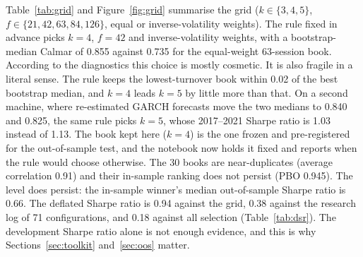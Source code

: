 Table~\ref{tab:grid} and Figure~\ref{fig:grid} summarise the grid ($k\in\{3,4,5\}$, $f\in\{21,42,63,84,126\}$, equal or inverse-volatility weights). The rule fixed in advance picks $k=4$, $f=42$ and inverse-volatility weights, with a bootstrap-median Calmar of 0.855 against 0.735 for the equal-weight 63-session book. According to the diagnostics this choice is mostly cosmetic. It is also fragile in a literal sense. The rule keeps the lowest-turnover book within 0.02 of the best bootstrap median, and $k=4$ leads $k=5$ by little more than that. On a second machine, where re-estimated GARCH forecasts move the two medians to 0.840 and 0.825, the same rule picks $k=5$, whose 2017--2021 Sharpe ratio is 1.03 instead of 1.13. The book kept here ($k=4$) is the one frozen and pre-registered for the out-of-sample test, and the notebook now holds it fixed and reports when the rule would choose otherwise. The 30 books are near-duplicates (average correlation 0.91) and their in-sample ranking does not persist (PBO 0.945). The level does persist: the in-sample winner's median out-of-sample Sharpe ratio is 0.66. The deflated Sharpe ratio is 0.94 against the grid, 0.38 against the research log of 71 configurations, and 0.18 against all selection (Table~\ref{tab:dsr}). The development Sharpe ratio alone is not enough evidence, and this is why Sections~\ref{sec:toolkit} and~\ref{sec:oos} matter.

